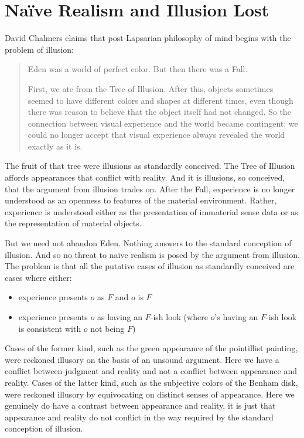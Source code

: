 \documentclass[12pt]{article}
\begin{document}


\section{Naïve Realism and Illusion Lost}\label{sec:naïve_realism_and_illusion_lost} %

David Chalmers claims that post-Lapsarian philosophy of mind begins with the problem of illusion:
\begin{quotation}
	\noindent Eden was a world of perfect color. But then there was a Fall.
	
	First, we ate from the Tree of Illusion. After this, objects sometimes seemed to have different colors and shapes at different times, even though there was reason to believe that the object itself had not changed. So the connection between visual experience and the world became contingent: we could no longer accept that visual experience always revealed the world exactly as it is. \citep{Chalmers:2006kx}
\end{quotation}
The fruit of that tree were illusions as standardly conceived. The Tree of Illusion affords appearances that conflict with reality. And it is illusions, so conceived, that the argument from illusion trades on. After the Fall, experience is no longer understood as an openness to features of the material environment. Rather, experience is understood either as the presentation of immaterial sense data or as the representation of material objects.

But we need not abandon Eden. Nothing answers to the standard conception of illusion. And so no threat to naïve realism is posed by the argument from illusion. The problem is that all the putative cases of illusion as standardly conceived are cases where either:
\begin{itemize}
	\item experience presents \( o \) as \( F \) and \( o \) is \( F \)
	\item experience presents \( o \) as having an \( F \)-ish look (where \( o \)'s having an \( F \)-ish look is consistent with \( o \) not being \( F \))
\end{itemize}
Cases of the former kind, such as the green appearance of the pointillist painting, were reckoned illusory on the basis of an unsound argument. Here we have a conflict between judgment and reality and not a conflict between appearance and reality. Cases of the latter kind, such as the subjective colors of the Benham disk, were reckoned illusory by equivocating on distinct senses of appearance. Here we genuinely do have a contrast between appearance and reality, it is just that appearance and reality do not conflict in the way required by the standard conception of illusion. 
\end{document}
